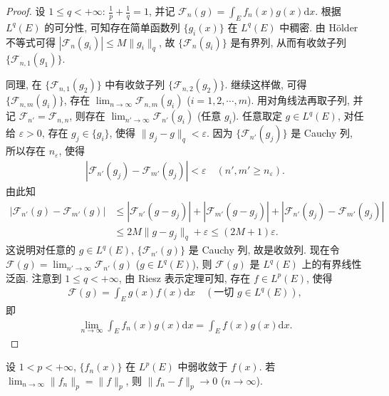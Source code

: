 \documentclass[../../main.tex]{subfiles}%
\begin{document}
\begin{proof}

设 $1\leqslant q<+\infty$: $\frac{1}{p}+\frac{1}{q}=1$, 并记 $\mathscr{F}_n(g)=\int_E f_n(x)g(x)\mathrm{d}x$. 根据 $L^q(E)$ 的可分性, 可知存在简单函数列 $\{g_i(x)\}$ 在 $L^q(E)$ 中稠密. 由 Hölder 不等式可得 $|\mathscr{F}_n(g_i)|\leqslant M\|g_i\|_q$, 故 $\{\mathscr{F}_n(g_i)\}$ 是有界列, 从而有收敛子列 $\{\mathscr{F}_{n,1}(g_1)\}$.

同理, 在 $\{\mathscr{F}_{n,1}(g_2)\}$ 中有收敛子列 $\{\mathscr{F}_{n,2}(g_2)\}$. 继续这样做, 可得 $\{\mathscr{F}_{n,m}(g_i)\}$, 存在 $\lim_{n\to\infty}\mathscr{F}_{n,m}(g_i)$ ($i=1,2,\cdots,m$). 用对角线法再取子列, 并记 $\mathscr{F}_{n'}=\mathscr{F}_{n,n}$, 则存在 $\lim_{n'\to\infty}\mathscr{F}_{n'}(g_i)$ (任意 $g_i$). 任意取定 $g\in L^q(E)$, 对任给 $\varepsilon>0$, 存在 $g_j\in\{g_i\}$, 使得 $\|g_j-g\|_q<\varepsilon$. 因为 $\{\mathscr{F}_{n'}(g_j)\}$ 是 Cauchy 列, 所以存在 $n_\varepsilon$, 使得
\begin{align*}
|\mathscr{F}_{n'}(g_j)-\mathscr{F}_{m'}(g_j)|<\varepsilon\quad (n',m'\geqslant n_\varepsilon).
\end{align*}
由此知
\begin{align*}
|\mathscr{F}_{n'}(g)-\mathscr{F}_{m'}(g)|
&\leqslant|\mathscr{F}_{n'}(g-g_j)|+|\mathscr{F}_{m'}(g-g_j)|+|\mathscr{F}_{n'}(g_j)-\mathscr{F}_{m'}(g_j)| \\
&\leqslant 2M\|g-g_j\|_q+\varepsilon\leqslant(2M+1)\varepsilon.
\end{align*}
这说明对任意的 $g\in L^q(E)$, $\{\mathscr{F}_{n'}(g)\}$ 是 Cauchy 列, 故是收敛列. 现在令 $\mathscr{F}(g)=\lim_{n'\to\infty}\mathscr{F}_{n'}(g)$ ($g\in L^q(E)$), 则 $\mathscr{F}(g)$ 是 $L^q(E)$ 上的有界线性泛函. 注意到 $1\leqslant q<+\infty$, 由 Riesz 表示定理可知, 存在 $f\in L^p(E)$, 使得
\begin{align*}
\mathscr{F}(g)=\int_E g(x)f(x)\mathrm{d}x\quad (\text{一切 } g\in L^q(E)),
\end{align*}
即
\begin{align*}
\lim_{n\to\infty}\int_E f_n(x)g(x)\mathrm{d}x=\int_E f(x)g(x)\mathrm{d}x.
\end{align*}

\end{proof}

\begin{theorem}
设 $1<p<+\infty$, $\{f_n(x)\}$ 在 $L^p(E)$ 中弱收敛于 $f(x)$. 若 $\lim_{n\to\infty}\|f_n\|_p=\|f\|_p$, 则 $\|f_n-f\|_p\to 0$ ($n\to\infty$).
\end{theorem}
\end{document}

